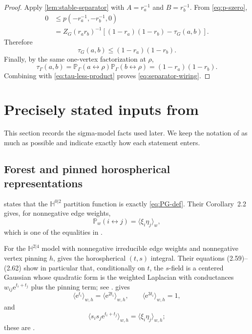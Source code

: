 \documentclass[11pt]{article}
\theoremstyle{definition}
\theoremstyle{remark}
\newcommand{\PP}{\mathbb P}
\newcommand{\HH}{\mathbb H}
\newcommand{\1}{\mathbf 1}
\newcommand{\e}{\mathrm e}
\begin{document}
\begin{proof}
Apply \cref{lem:stable-separator} with $A=r_a^{-1}$ and $B=r_b^{-1}$.  From
\eqref{eq:p-szero},
\begin{equation}\begin{aligned}
 0&\le p(-r_a^{-1},-r_b^{-1},0)\\
 &=Z_G(r_ar_b)^{-1}
 \left[(1-r_a)(1-r_b)-\tau_G(a,b)\right].
\end{aligned}\end{equation}
Therefore
\begin{equation}\label{eq:tau-less-product}
 \tau_G(a,b)\le(1-r_a)(1-r_b).
\end{equation}
Finally, by the same one-vertex factorization at $\rho$,
\begin{equation}
 \tau_\Gamma(a,b)
 =\PP_\Gamma(a\leftrightarrow\rho)\PP_\Gamma(b\leftrightarrow\rho)
 =(1-r_a)(1-r_b).
\end{equation}
Combining with \eqref{eq:tau-less-product} proves \eqref{eq:separator-wiring}.
\end{proof}

\section{Precisely stated inputs from \texorpdfstring{\cite{BCHS}}{BCHS}}\label{sec:BCHS}

This section records the sigma-model facts used later.  We keep the notation of \cite{BCHS} as
much as possible and indicate exactly how each statement enters.

\subsection{Forest and pinned horospherical representations}

\cite[Theorem~2.1, (2.8)]{BCHS} states that the $\HH^{0|2}$ partition function is exactly
\eqref{eq:PG-def}.  Their Corollary~2.2 gives,
for nonnegative edge weights,
\begin{equation}\label{eq:BCHS-ferm-connect}
 \PP_w(i\leftrightarrow j)=\langle\xi_i\eta_j\rangle_w,
\end{equation}
which is one of the equalities in
\cite[Corollary~2.2, (2.11)]{BCHS}.

For the $\HH^{2|4}$ model with nonnegative irreducible edge weights and nonnegative
vertex pinning $h$, \cite[Proposition~2.9]{BCHS} gives the horospherical $(t,s)$ integral.
Their equations (2.59)--(2.62) show in particular that, conditionally on $t$, the
$s$-field is a centered Gaussian whose quadratic form is the weighted Laplacian with
conductances $w_{ij}\e^{t_i+t_j}$ plus the pinning term; see
\cite[Proposition~2.9, (2.59)--(2.62)]{BCHS}.  \cite[Corollary~2.10]{BCHS} gives
\begin{equation}\label{eq:BCHS-moments-unpinned}
 \langle\e^{t_i}\rangle_{w,h}
 =\langle\e^{2t_i}\rangle_{w,h},
 \qquad
 \langle\e^{3t_i}\rangle_{w,h}=1,
\end{equation}
and
\begin{equation}\label{eq:BCHS-s-fermion}
 \langle s_is_j\e^{t_i+t_j}\rangle_{w,h}
 =\langle\xi_i\eta_j\rangle_{w,h};
\end{equation}
these are
\cite[Corollary~2.10, (2.63)--(2.64)]{BCHS}.
\end{document}
